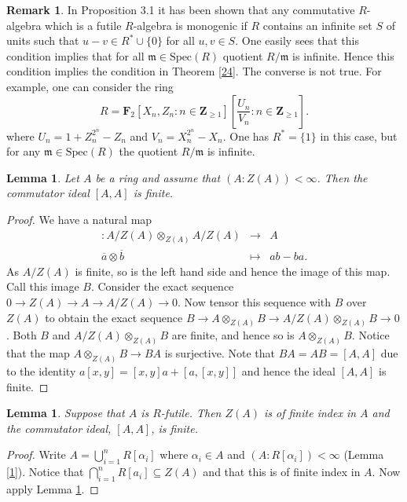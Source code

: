 \documentclass{amsart}
\theoremstyle{plain}
\newtheorem{lemma}[theorem]{Lemma}
\theoremstyle{definition}
\newtheorem{remark}[theorem]{Remark}
\begin{document}
\begin{remark}
 In \cite{DO4} Proposition 3.1 it has been shown that any commutative $R$-algebra which is a futile $R$-algebra is monogenic if $R$ contains
an infinite set $S$
of units such that $u-v \in R^* \cup \{0\}$ for all $u,v \in S$. One easily sees that this condition implies that for all ${\mathfrak{m}} \in
\mathrm{Spec}(R)$ quotient $R/{\mathfrak{m}}$ is infinite. Hence this condition implies the condition in Theorem \ref{24}. The converse is not true. For example,
one can consider
the ring \[R={\mathbf{F}}_2[X_n,Z_n: n \in {\mathbf{Z}}_{\geq 1}][\frac{U_n}{V_n}: n \in {\mathbf{Z}}_{\geq 1}].\] where
$U_n=1+Z_n^{2^n}-Z_n$ and $V_n=X_n^{2^n}-X_n$. One has $R^*=\{1\}$ in this case, but for any ${\mathfrak{m}} \in \mathrm{Spec}(R)$ the quotient $R/{\mathfrak{m}}$ is
infinite.
\end{remark}

\begin{lemma} \label{100}
 Let $A$ be a ring and assume that $(A:Z(A))<\infty$. Then the commutator ideal $[A,A]$ is finite.
\end{lemma}
\begin{proof}
 We have a natural map
\begin{eqnarray*}
[\ ,\ ]: A/Z(A) \otimes_{Z(A)} A/Z(A) &\to& A \\
 \overline{a} \otimes \overline{b} &\mapsto& ab-ba. 
\end{eqnarray*}
As $A/Z(A)$ is finite, so is the left hand side and hence the image of this map. Call this image $B$. Consider the exact sequence
$0 \to Z(A) \to
A \to A/Z(A) \to 0$. Now tensor this sequence with $B$ over $Z(A)$ to obtain the exact sequence $B \to A \otimes_{Z(A)} B \to
A/Z(A) \otimes_{Z(A)}
B \to 0$. Both $B$ and $A/Z(A) \otimes_{Z(A)} B$ are finite, and hence so is $A \otimes_{Z(A)} B$. Notice that the map $A \otimes_{Z(A)} B \to BA$ is
surjective. Note that $BA=AB=[A,A]$ due to the identity $a[x,y]=[x,y]a+[a,[x,y]]$ and hence the ideal $[A,A]$ is finite. 
\end{proof}

\begin{lemma} \label{9} 
Suppose that $A$ is $R$-futile. Then $Z(A)$ is of finite index in $A$ and the commutator ideal, $[A,A]$, is finite.
\end{lemma}
\begin{proof}
 Write $A=\bigcup_{i=1}^n R[\alpha_i]$ where $\alpha_i \in A$ and $(A:R[\alpha_i])<\infty$ (Lemma \ref{1}). Notice that $\bigcap_{i=1}^n R[a_i]
\subseteq Z(A)$ and that this is of finite index in $A$. Now apply Lemma \ref{100}.
\end{proof}
\end{document}
